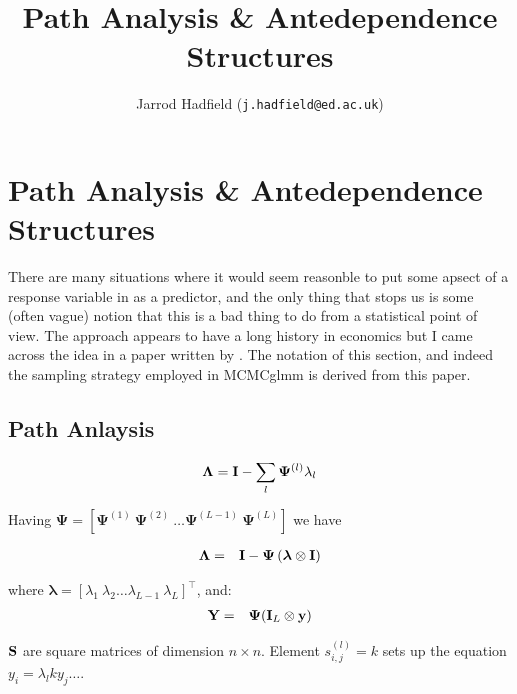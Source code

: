 \documentclass{article}
\title{Path Analysis \& Antedependence Structures}
\author{Jarrod Hadfield (\texttt{j.hadfield@ed.ac.uk})}
\begin{document}
\maketitle
\else
\chapter{Path Analysis \& Antedependence Structures}
\label{SandR}
\fi


There are many situations where it would seem reasonble to put some apsect of a response variable in as a predictor, and the only thing that stops us is some (often vague) notion that this is a bad thing to do from a statistical point of view. The approach appears to have a long history in economics but I came across the idea in a paper written by  \citet{Gianola.2004}. The notation of this section, and indeed the sampling strategy employed in MCMCglmm is derived from this paper.\\

\section{Path Anlaysis}

\begin{equation}
{\bm \Lambda} = {\bf I} - \sum_{l}{\bf \Psi}^{(l)}{\lambda_{l}}
\end{equation}

Having ${\bm \Psi} = \left[{\bm \Psi}^{(1)}\ {\bm \Psi}^{(2)}\ \dots {\bm \Psi}^{(L-1)}\ {\bm \Psi}^{(L)}\right]$ we have 

\begin{equation}
\begin{array}{rl}
{\bm \Lambda} =& {\bf I}-{\bm \Psi}\left({\bm \lambda} \otimes {\bf I} \right)\\
\end{array}
\label{rs-Eq}
\end{equation}

where ${\bm \lambda} = \left[\lambda_{1}\ \lambda_{2} \dots \lambda_{L-1}\ \lambda_{L} \right]^{\top}$, and:\\

\begin{equation}
\begin{array}{rl}
{\bf Y} =&  {\bm \Psi}({\bf I}_{L} \otimes {\bf y})\\
\end{array}
\end{equation}


${\bf S}$ are square matrices of dimension $n \times n$. Element $s_{i,j}^{(l)}=k$ sets up the equation $y_{i} = \lambda_{l}ky_{j} \dots$.\\
\end{document}
